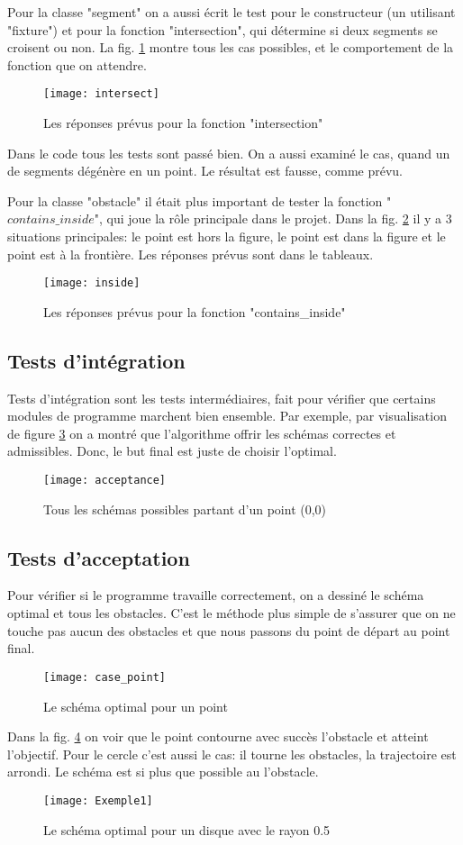 \documentclass[12pt]{article}
\begin{document}
	Pour la classe "segment" on a aussi écrit le test pour le constructeur (un utilisant "fixture") et pour la fonction "intersection", qui détermine si deux segments se croisent ou non. La fig. \ref{fig:intersection} montre tous les cas possibles, et le comportement de la fonction que on attendre.
	\begin{figure}[H]
		\centering
		\texttt{[image: intersect]}
		\caption{Les réponses prévus pour la fonction "intersection"}
		\label{fig:intersection}
	\end{figure}
	Dans le code tous les tests sont passé bien. On a aussi examiné le cas, quand un de segments dégénère en un point. Le résultat est fausse, comme prévu.
	
	
	Pour la classe "obstacle" il était plus important de tester la fonction "$contains\_inside$", qui joue la rôle principale dans le projet. Dans la fig. \ref{inside} il y a 3 situations principales: le point est hors la figure, le point est dans la figure et le point est à la frontière. Les réponses prévus sont dans le tableaux. 
	\begin{figure}[H]
		\centering
		\texttt{[image: inside]}
		\caption{Les réponses prévus pour la fonction "contains\_inside"}
		\label{inside}
	\end{figure}
	\subsection{Tests d'intégration}
	Tests d'intégration sont les tests intermédiaires, fait pour vérifier que certains modules de programme marchent bien ensemble.
	Par exemple, par visualisation de figure \ref{integration} on a montré que l'algorithme offrir les schémas correctes et admissibles. Donc, le but final est juste de choisir l'optimal.
		\begin{figure}[H]
		\centering
		\texttt{[image: acceptance]}
		\caption{Tous les schémas possibles partant d'un point (0,0)}
		\label{integration}
	\end{figure}
	\subsection {Tests d'acceptation}	
	Pour vérifier si le programme travaille correctement, on a dessiné le schéma optimal et tous les obstacles. C'est le méthode plus simple de s'assurer que on ne touche pas aucun des obstacles et que nous passons du point de départ au point final. 
	\begin{figure}[H]
		\centering
		\texttt{[image: case\_point]}
		\caption{Le schéma optimal pour un point}
		\label{fig:point}
	\end{figure}
	Dans la fig. \ref{fig:point} on voir que le point contourne avec succès l'obstacle et atteint l'objectif. Pour le cercle c'est aussi le cas: il tourne les obstacles, la trajectoire est arrondi. Le schéma est si plus que possible au l'obstacle.
	\begin{figure}[H]
		\centering
		\texttt{[image: Exemple1]}
		\caption{Le schéma optimal pour un disque avec le rayon 0.5 }
		\label{fig:disk}
	\end{figure}
\end{document}
